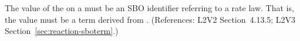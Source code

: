 The value of the   on a \KineticLaw must be an SBO
identifier referring to a rate law.  That is, the value must be a term
derived from \sboratelaw.  (References: L2V2 Section~4.13.5; L2V3
Section~\ref{sec:reaction-sboterm}.)
